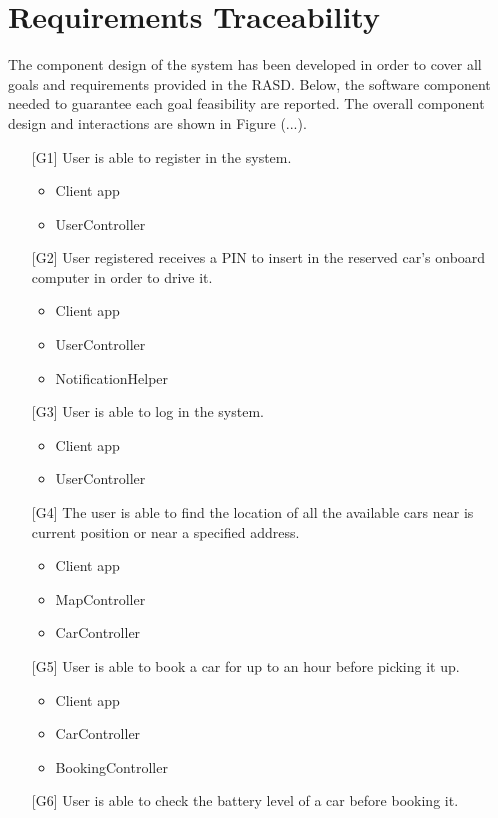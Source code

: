\chapter{Requirements Traceability}
The component design of the system has been developed in order to cover all goals and requirements provided in the RASD. Below, the software component needed to guarantee each goal feasibility are reported.
The overall component design and interactions are shown in Figure (...).

\begin{itemize}
	\item[{[G1]}] User is able to register in the system.
		\begin{itemize}
			\item Client app
			\item UserController
		\end{itemize}
	\item[{[G2]}] User registered receives a PIN to insert in the reserved car's onboard computer in order to drive it.
		\begin{itemize}
			\item Client app
			\item UserController
			\item NotificationHelper
		\end{itemize}
	\item[{[G3]}] User is able to log in the system.
		\begin{itemize}
			\item Client app
			\item UserController
		\end{itemize}
	\item[{[G4]}] The user is able to find the location of all the available cars near is current position or near a specified address.
		\begin{itemize}
			\item Client app
			\item MapController
			\item CarController
		\end{itemize}
	\item[{[G5]}] User is able to book a car for up to an hour before picking it up.
		\begin{itemize}
			\item Client app
			\item CarController
			\item BookingController
		\end{itemize}
	\item[{[G6]}] User is able to check the battery level of a car before booking it.

\end{itemize}
